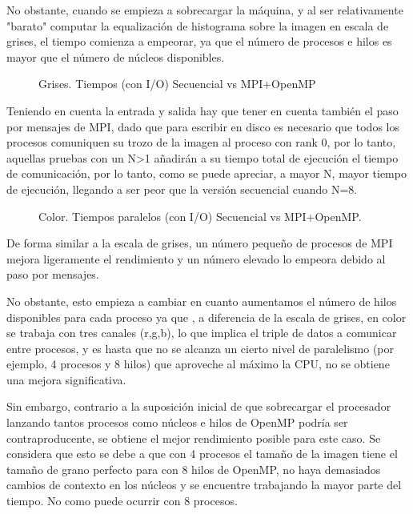 \documentclass[12pt]{report} %
\begin{document}
No obstante, cuando se empieza a sobrecargar la máquina, y al ser relativamente "barato" computar la equalización
de histograma sobre la imagen en escala de grises, el tiempo comienza a empeorar, ya que el número de procesos
e hilos es mayor que el número de núcleos disponibles.

\begin{figure}[H]
    \makebox[\textwidth][c]{
        
    }
    \caption{Grises. Tiempos (con I/O) Secuencial vs MPI+OpenMP}
    \label{fig:tiempos_io_gris}
\end{figure}

Teniendo en cuenta la entrada y salida hay que tener en cuenta también el paso por mensajes de MPI,
dado que para escribir en disco es necesario que todos los
procesos comuniquen su trozo de la imagen al proceso con rank 0, por lo tanto, aquellas pruebas con un N>1
añadirán a su tiempo total de ejecución el tiempo de comunicación, por lo tanto, como se puede apreciar, a mayor
N, mayor tiempo de ejecución, llegando a ser peor que la versión secuencial cuando N=8.

\begin{figure}[H]
	\makebox[\textwidth][c]{
        
    }
    \caption{Color. Tiempos paralelos (con I/O) Secuencial vs MPI+OpenMP.}
    \label{fig:color_tiempos}
\end{figure}

De forma similar a la escala de grises, un número pequeño de procesos de MPI mejora ligeramente el
rendimiento y un número elevado lo empeora debido al paso por mensajes.

No obstante, esto empieza a cambiar en cuanto aumentamos el número de hilos disponibles para cada proceso
ya que , a diferencia de la escala de grises, en color se trabaja
con tres canales (r,g,b), lo que implica el triple de datos a comunicar entre procesos, y es hasta que no se
alcanza un cierto nivel de paralelismo (por ejemplo, 4 procesos y 8 hilos) que aproveche al máximo la CPU,
no se obtiene una mejora significativa.

Sin embargo, contrario a la suposición inicial de que sobrecargar el procesador lanzando tantos procesos
como núcleos e hilos de OpenMP podría ser contraproducente, se obtiene el mejor rendimiento posible para este
caso. Se considera que esto se debe a que con 4 procesos el tamaño de la imagen tiene el tamaño de grano
perfecto para con 8 hilos de OpenMP, no haya demasiados cambios de contexto en los núcleos y se encuentre
trabajando la mayor parte del tiempo. No como puede ocurrir con 8 procesos.
\end{document}

